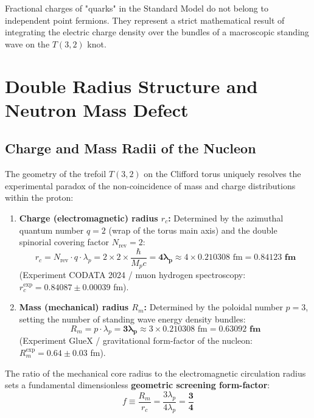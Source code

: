 \documentclass[12pt,a4paper]{article}
\begin{document}
		Fractional charges of "quarks" in the Standard Model do not belong to independent point fermions. They represent a strict mathematical result of integrating the electric charge density over the bundles of a macroscopic standing wave on the $T(3,2)$ knot.
		
		\section{Double Radius Structure and Neutron Mass Defect}
		
		\subsection{Charge and Mass Radii of the Nucleon}
		The geometry of the trefoil $T(3,2)$ on the Clifford torus uniquely resolves the experimental paradox of the non-coincidence of mass and charge distributions within the proton:
		\begin{enumerate}
			\item \textbf{Charge (electromagnetic) radius $r_c$:} 
			Determined by the azimuthal quantum number $q=2$ (wrap of the torus main axis) and the double spinorial covering factor $N_{\text{rev}} = 2$:
			\begin{equation}
				r_c = N_{\text{rev}} \cdot q \cdot \lambda_p = 2 \times 2 \times \frac{\hbar}{M_p c} = \mathbf{4 \lambda_p} \approx 4 \times 0.210308 \text{ fm} = \mathbf{0.84123 \text{ fm}}
			\end{equation}
			(Experiment CODATA 2024 / muon hydrogen spectroscopy: $r_c^{\text{exp}} = 0.84087 \pm 0.00039$ fm).
			
			\item \textbf{Mass (mechanical) radius $R_m$:} 
			Determined by the poloidal number $p=3$, setting the number of standing wave energy density bundles:
			\begin{equation}
				R_m = p \cdot \lambda_p = \mathbf{3 \lambda_p} \approx 3 \times 0.210308 \text{ fm} = \mathbf{0.63092 \text{ fm}}
			\end{equation}
			(Experiment GlueX / gravitational form-factor of the nucleon: $R_m^{\text{exp}} = 0.64 \pm 0.03$ fm).
		\end{enumerate}
		
		The ratio of the mechanical core radius to the electromagnetic circulation radius sets a fundamental dimensionless \textbf{geometric screening form-factor}:
		\begin{equation}
			f \equiv \frac{R_m}{r_c} = \frac{3 \lambda_p}{4 \lambda_p} = \mathbf{\frac{3}{4}}
		\end{equation}
		
\end{document}
